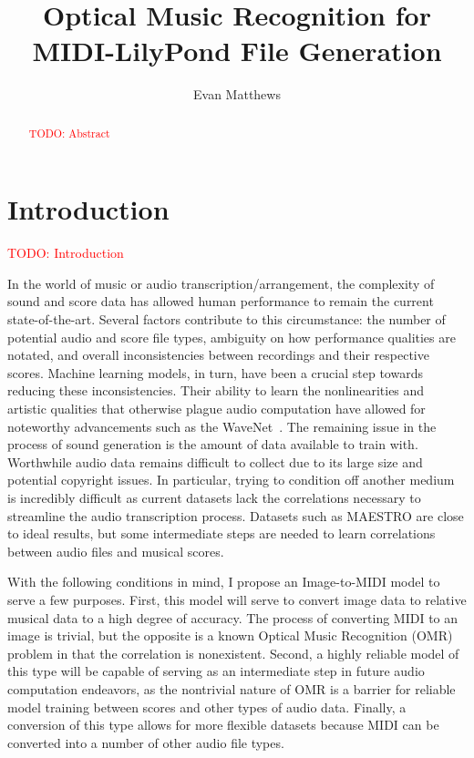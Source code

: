\documentclass[review,sigconf]{acmart}
\newcommand{\todo}[1]{\textcolor{red}{TODO: #1}}
\begin{document}
\title[omr-lilypond-midi]{Optical Music Recognition for MIDI-LilyPond File Generation}
\author{Evan Matthews}

\begin{abstract}
\todo{Abstract}
\end{abstract}

\maketitle

\section{Introduction}
\todo{Introduction}
~\cite{oord2016wavenet,contreras2023omrcnn,contreras2023omrpiano,mayer2024practical,andrea2021note}

In the world of music or audio transcription/arrangement, the complexity of sound and score data has allowed human performance to remain the current state-of-the-art. Several factors contribute to this circumstance: the number of potential audio and score file types, ambiguity on how performance qualities are notated, and overall inconsistencies between recordings and their respective scores. Machine learning models, in turn, have been a crucial step towards reducing these inconsistencies. Their ability to learn the nonlinearities and artistic qualities that otherwise plague audio computation have allowed for noteworthy advancements such as the WaveNet~\cite{oord2016wavenet}. The remaining issue in the process of sound generation is the amount of data available to train with. Worthwhile audio data remains difficult to collect due to its large size and potential copyright issues. In particular, trying to condition off another medium is incredibly difficult as current datasets lack the correlations necessary to streamline the audio transcription process. Datasets such as MAESTRO are close to ideal results, but some intermediate steps are needed to learn correlations between audio files and musical scores.

With the following conditions in mind, I propose an Image-to-MIDI model to serve a few purposes. First, this model will serve to convert image data to relative musical data to a high degree of accuracy. The process of converting MIDI to an image is trivial, but the opposite is a known Optical Music Recognition (OMR) problem in that the correlation is nonexistent. Second, a highly reliable model of this type will be capable of serving as an intermediate step in future audio computation endeavors, as the nontrivial nature of OMR is a barrier for reliable model training between scores and other types of audio data. Finally, a conversion of this type allows for more flexible datasets because MIDI can be converted into a number of other audio file types.
\end{document}
